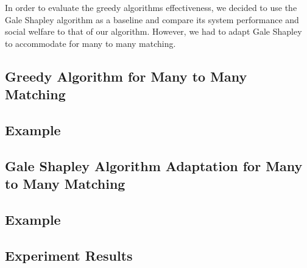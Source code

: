 \documentclass[11pt, letterpaper]{article}
\begin{document}
In order to evaluate the greedy algorithms effectiveness, we decided to use the Gale Shapley algorithm as a baseline and compare its system performance and social welfare to that of our algorithm.  However, we had to adapt Gale Shapley to accommodate for many to many matching. 

\subsection{Greedy Algorithm for Many to Many Matching}

	\subsection{Example}

\subsection{Gale Shapley Algorithm Adaptation for Many to Many Matching}

	\subsection{Example}

\subsection{Experiment Results}

\end{document}
